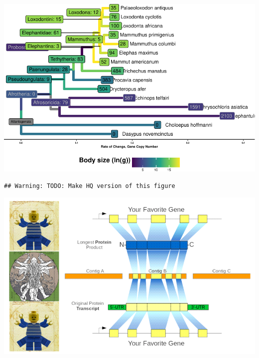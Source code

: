 \documentclass[]{elsarticle} %
\let\origfigure\figure
\let\endorigfigure\endfigure
\renewenvironment{figure}[1][2] {
    \expandafter\origfigure\expandafter[H]
} {
    \endorigfigure
}
\begin{document}
\begin{figure}[H]
\includegraphics[width=6in,]{paper_PLOS_draft_files/figure-latex/Figure-GeneDup-BLScaled-1} \caption{Gene copy increases polarized along Atlantogenata, colored by ln(Body Size), with branch lengths equal to the change in gene copy number}\label{fig:Figure-GeneDup-BLScaled}
\end{figure}

\begin{verbatim}
## Warning: TODO: Make HQ version of this figure
\end{verbatim}

\begin{figure}[H]
\includegraphics[width=6in,]{paper_PLOS_draft_files/figure-latex/Figure-RBHBStrategy-1} \caption{Full version of RecBlat strategy, but low quality}\label{fig:Figure-RBHBStrategy}
\end{figure}
\end{document}

